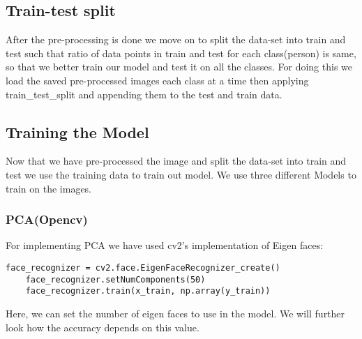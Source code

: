 \subsection{Train-test split}
After the pre-processing is done we move on to split the data-set into train and test such that ratio of data points in train and test for each class(person) is same, so that we better train our model and test it on all the classes. For doing this we load the saved pre-processed images each class at a time then applying train\_test\_split and appending them to the test and train data.

\subsection{Training the Model}
Now that we have pre-processed the image and split the data-set into train and test we use the training data to train out model. We use three different Models to train on the images.

\subsubsection{PCA(Opencv)}
For implementing PCA we have used cv2's implementation of Eigen faces:
    \begin{lstlisting}[style=Python]
    face_recognizer = cv2.face.EigenFaceRecognizer_create()
    face_recognizer.setNumComponents(50)
    face_recognizer.train(x_train, np.array(y_train))
    \end{lstlisting}
Here, we can set the number of eigen faces to use in the model. We will further look how the accuracy depends on this value.

